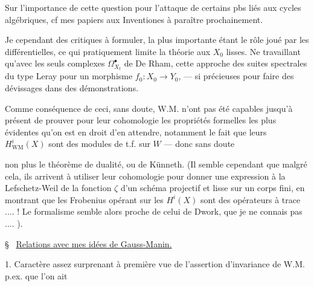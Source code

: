 Sur l'importance de cette question  pour l'attaque de certains pbs liés aux  cycles algébriques, cf mes papiers aux Inventiones \inserted{$[\,]$} à paraître prochainement.


Je  cependant des  critiques à formuler, la plus importante étant le rôle joué par les différentielles, ce qui pratiquement limite la théorie aux $X_0$ lisses.
Ne  travaillant qu'avec les seuls complexes $\Omega^\bullet_{X_t}$ de  De Rham,  cette approche   des suites spectrales du  type Leray pour un morphisme $f_0:X_0\to Y_0$, --- si précieuses pour faire des dévissages dans des démonstrations.

Comme conséquence de  ceci, sans doute, W.M. n'ont pas été capables jusqu'à présent de prouver pour leur cohomologie les  propriétés formelles les plus évidentes qu'on est en droit d'en attendre, notamment le fait que leurs $H^i_{\mathrm{WM}}(X)$ sont des modules de t.f. sur $W$ --- donc sans doute


non plus le théorème de dualité, ou de Künneth. 
(Il semble cependant que malgré cela, ils arrivent à utiliser leur cohomologie pour donner une expression à la Lefschetz-Weil de la fonction $\zeta$ d'un schéma projectif et lisse sur un corps fini, en montrant que les Frobenius opérant sur les $H^i(X)$ sont des opérateurs à trace .... ! Le formalisme semble alors proche de celui de Dwork, que je ne connais pas .... ).

\S\   \uline{Relations  avec mes idées de Gauss-Manin.}

1. Caractère assez surprenant à première vue de l'assertion d'invariance de W.M.  p.ex. que l'on ait


